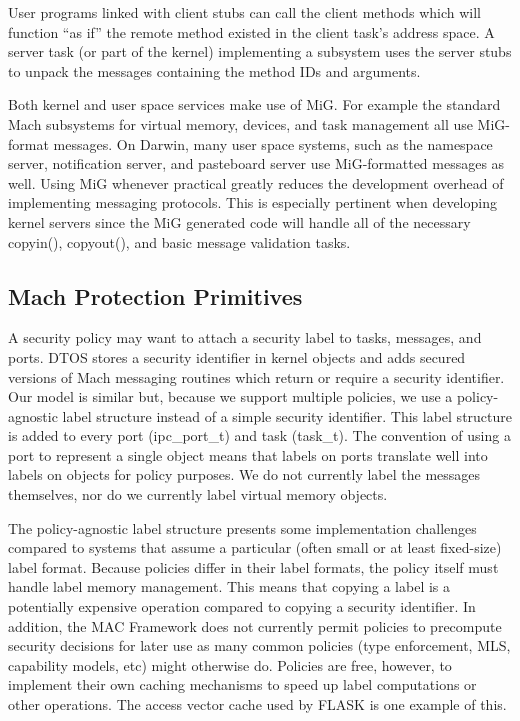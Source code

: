 User programs linked with client stubs can call the client methods
which will function ``as if'' the remote method existed in the client
task's address space. A server task (or part of the kernel)
implementing a subsystem uses the server stubs to unpack the messages
containing the method IDs and arguments.

Both kernel and user space services make use of MiG. For example the
standard Mach subsystems for virtual memory, devices, and task
management all use MiG-format messages. On Darwin, many user space
systems, such as the namespace server, notification server, and
pasteboard server use MiG-formatted messages as well.  Using MiG
whenever practical greatly reduces the development overhead of
implementing messaging protocols. This is especially pertinent when
developing kernel servers since the MiG generated code will handle
all of the necessary copyin(), copyout(), and basic message validation
tasks.


\subsection{Mach Protection Primitives}

A security policy may want to attach a security label to
tasks, messages, and ports. DTOS stores a security identifier in
kernel objects and adds secured versions of Mach messaging routines
which return or require a security identifier. Our model is similar but,
because we support multiple policies, we use a policy-agnostic label
structure instead of a simple security identifier. This label
structure is added to every port (ipc\_port\_t) and task (task\_t).
The convention of using a port to represent a single object means
that labels on ports translate well into labels on objects for
policy purposes. We do not currently label the messages themselves,
nor do we currently label virtual memory objects.

The policy-agnostic label structure presents some implementation
challenges compared to systems that assume a particular (often small
or at least fixed-size) label format. Because policies differ in
their label formats, the policy itself must handle label memory
management.  This means that copying a label is a potentially
expensive operation compared to copying a security identifier. In
addition, the MAC Framework does not currently permit policies
to precompute security decisions for later use as many common
policies (type enforcement, MLS, capability models, etc) might
otherwise do.  Policies are free, however, to implement their own
caching mechanisms to speed up label computations or other operations.
The access vector cache used by FLASK is one example of this.

